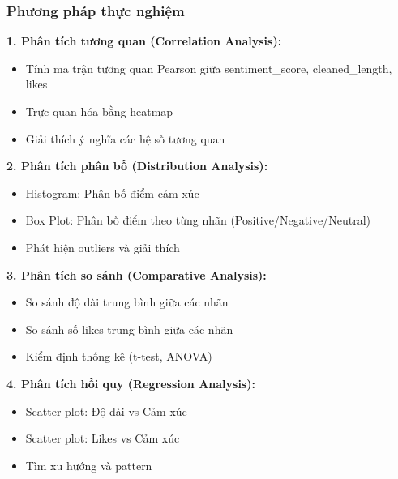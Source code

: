 \subsubsection{Phương pháp thực nghiệm}
\textbf{1. Phân tích tương quan (Correlation Analysis):}
\begin{itemize}
    \item Tính ma trận tương quan Pearson giữa sentiment\_score, cleaned\_length, likes
    \item Trực quan hóa bằng heatmap
    \item Giải thích ý nghĩa các hệ số tương quan
\end{itemize}

\textbf{2. Phân tích phân bố (Distribution Analysis):}
\begin{itemize}
    \item Histogram: Phân bố điểm cảm xúc
    \item Box Plot: Phân bố điểm theo từng nhãn (Positive/Negative/Neutral)
    \item Phát hiện outliers và giải thích
\end{itemize}

\textbf{3. Phân tích so sánh (Comparative Analysis):}
\begin{itemize}
    \item So sánh độ dài trung bình giữa các nhãn
    \item So sánh số likes trung bình giữa các nhãn
    \item Kiểm định thống kê (t-test, ANOVA)
\end{itemize}

\textbf{4. Phân tích hồi quy (Regression Analysis):}
\begin{itemize}
    \item Scatter plot: Độ dài vs Cảm xúc
    \item Scatter plot: Likes vs Cảm xúc
    \item Tìm xu hướng và pattern
\end{itemize}

